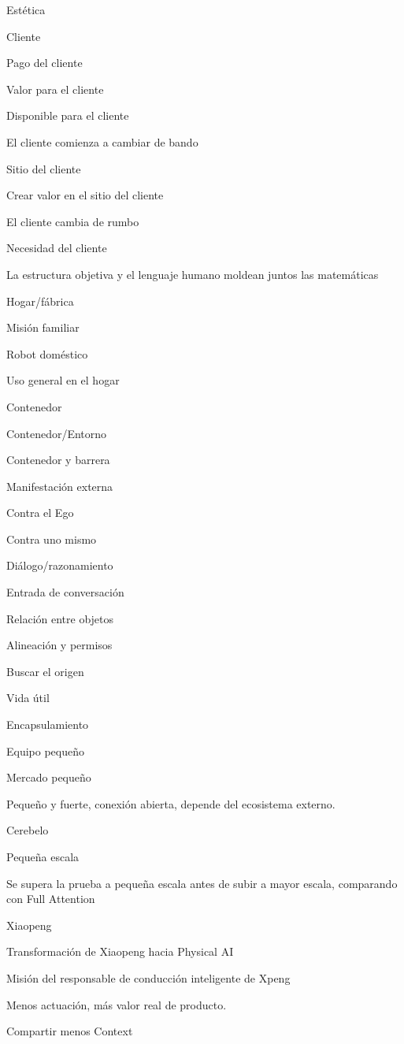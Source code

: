 \documentclass{article}
\begin{document}
Estética

Cliente

Pago del cliente

Valor para el cliente

Disponible para el cliente

El cliente comienza a cambiar de bando

Sitio del cliente

Crear valor en el sitio del cliente

El cliente cambia de rumbo

Necesidad del cliente

La estructura objetiva y el lenguaje humano moldean juntos las matemáticas

Hogar/fábrica

Misión familiar

Robot doméstico

Uso general en el hogar

Contenedor

Contenedor/Entorno

Contenedor y barrera

Manifestación externa

Contra el Ego

Contra uno mismo

Diálogo/razonamiento

Entrada de conversación

Relación entre objetos

Alineación y permisos

Buscar el origen

Vida útil

Encapsulamiento

Equipo pequeño

Mercado pequeño

Pequeño y fuerte, conexión abierta, depende del ecosistema externo.

Cerebelo

Pequeña escala

Se supera la prueba a pequeña escala antes de subir a mayor escala, comparando con Full Attention

Xiaopeng

Transformación de Xiaopeng hacia Physical AI

Misión del responsable de conducción inteligente de Xpeng

Menos actuación, más valor real de producto.

Compartir menos Context
\end{document}
